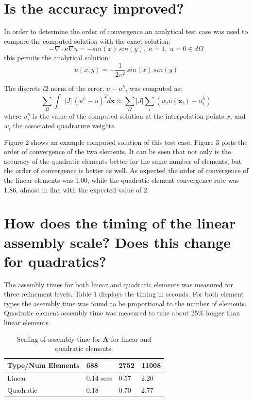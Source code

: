 \documentclass[letterpaper,10pt]{article}
\newcommand{\bes}{\begin{equation*}}
\newcommand{\ees}{\end{equation*}}
\begin{document}
\section*{Is the accuracy improved?}
In order to determine the order of convergence an analytical test case was used to compare the computed solution with the exact solution:
\bes -\nabla \cdot \kappa \nabla u = -sin(x)\,sin(y), \; \kappa=1, \; u=0 \in d\Omega \ees
this permits the analytical solution:
\bes  u(x,y) = -\frac{1}{2 \pi^2}\,sin(x)\,sin(y) \ees

The discrete $l2$ norm of the error, $u - u^h$, was computed as:
\bes \sum_{\Omega} \int_\tau |J| \, (u^h-u)^2 d\mathbf{x} \approx \sum_{\Omega} |J| \sum_i \left( w_i u(\mathbf{x}_i) - u^h_i \right) \ees
where $u_i^h$ is the value of the computed solution at the interpolation points $x_i$ and $w_i$ the associated quadrature weights.

Figure 2 shows an example computed solution of this test case. Figure 3 plots the order of convergence of the two elements. It can be seen that not only is the accuracy of the quadratic elements better for the same number of elements, but the order of convergence is better as well. As expected the order of convergence of the linear elements was 1.00, while the quadratic element convergence rate was 1.86, almost in line with the expected value of 2.

\section*{How does the timing of the linear assembly scale? Does this change for quadratics?}
The assembly times for both linear and quadratic elements was measured for three refinement levels. Table 1 displays the timing in seconds. For both element types the assembly time was found to be proportional to the number of elements. Quadratic element assembly time was measured to take about 25\% longer than linear elements.
\begin{table}[!htb]
\centering
    \begin{tabular}{|l|l|l|l|}
        \hline
        Type/Num Elements & 688  & 2752 & 11008 \\ \hline
        Linear            & 0.14 secs & 0.57 & 2.20  \\
        Quadratic         & 0.18 & 0.70 & 2.77  \\
        \hline
    \end{tabular}
    \caption{Scaling of assembly time for $\mathbf{A}$ for linear and quadratic elements.}
\end{table}
\end{document}
